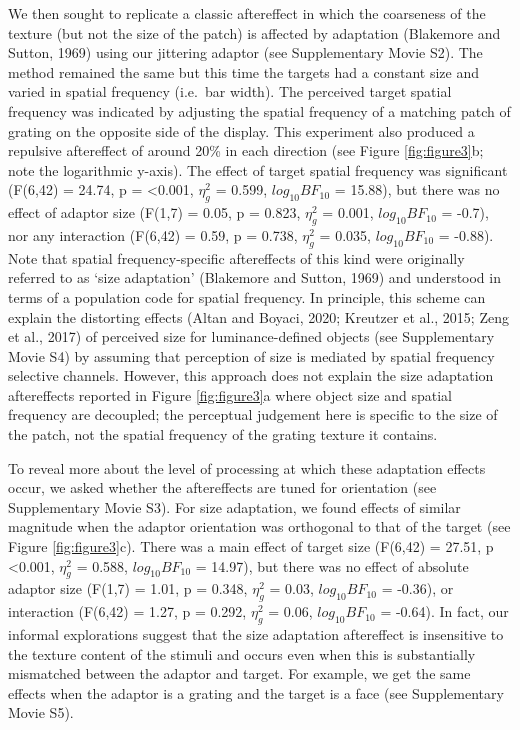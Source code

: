 \documentclass[
]{article}
\begin{document}
We then sought to replicate a classic aftereffect in which the coarseness of the texture (but not the size of the patch) is affected by adaptation (Blakemore and Sutton, 1969) using our jittering adaptor (see Supplementary Movie S2). The method remained the same but this time the targets had a constant size and varied in spatial frequency (i.e.~bar width). The perceived target spatial frequency was indicated by adjusting the spatial frequency of a matching patch of grating on the opposite side of the display. This experiment also produced a repulsive aftereffect of around 20\% in each direction (see Figure \ref{fig:figure3}b; note the logarithmic y-axis). The effect of target spatial frequency was significant (F(6,42) = 24.74, p = \textless0.001, \(\eta^2_g\) = 0.599, \(log_{10}BF_{10}\) = 15.88), but there was no effect of adaptor size (F(1,7) = 0.05, p = 0.823, \(\eta^2_g\) = 0.001, \(log_{10}BF_{10}\) = -0.7), nor any interaction (F(6,42) = 0.59, p = 0.738, \(\eta^2_g\) = 0.035, \(log_{10}BF_{10}\) = -0.88). Note that spatial frequency-specific aftereffects of this kind were originally referred to as `size adaptation' (Blakemore and Sutton, 1969) and understood in terms of a population code for spatial frequency. In principle, this scheme can explain the distorting effects (Altan and Boyaci, 2020; Kreutzer et al., 2015; Zeng et al., 2017) of perceived size for luminance-defined objects (see Supplementary Movie S4) by assuming that perception of size is mediated by spatial frequency selective channels. However, this approach does not explain the size adaptation aftereffects reported in Figure \ref{fig:figure3}a where object size and spatial frequency are decoupled; the perceptual judgement here is specific to the size of the patch, not the spatial frequency of the grating texture it contains.

To reveal more about the level of processing at which these adaptation effects occur, we asked whether the aftereffects are tuned for orientation (see Supplementary Movie S3). For size adaptation, we found effects of similar magnitude when the adaptor orientation was orthogonal to that of the target (see Figure \ref{fig:figure3}c). There was a main effect of target size (F(6,42) = 27.51, p \textless0.001, \(\eta^2_g\) = 0.588, \(log_{10}BF_{10}\) = 14.97), but there was no effect of absolute adaptor size (F(1,7) = 1.01, p = 0.348, \(\eta^2_g\) = 0.03, \(log_{10}BF_{10}\) = -0.36), or interaction (F(6,42) = 1.27, p = 0.292, \(\eta^2_g\) = 0.06, \(log_{10}BF_{10}\) = -0.64). In fact, our informal explorations suggest that the size adaptation aftereffect is insensitive to the texture content of the stimuli and occurs even when this is substantially mismatched between the adaptor and target. For example, we get the same effects when the adaptor is a grating and the target is a face (see Supplementary Movie S5).
\end{document}
